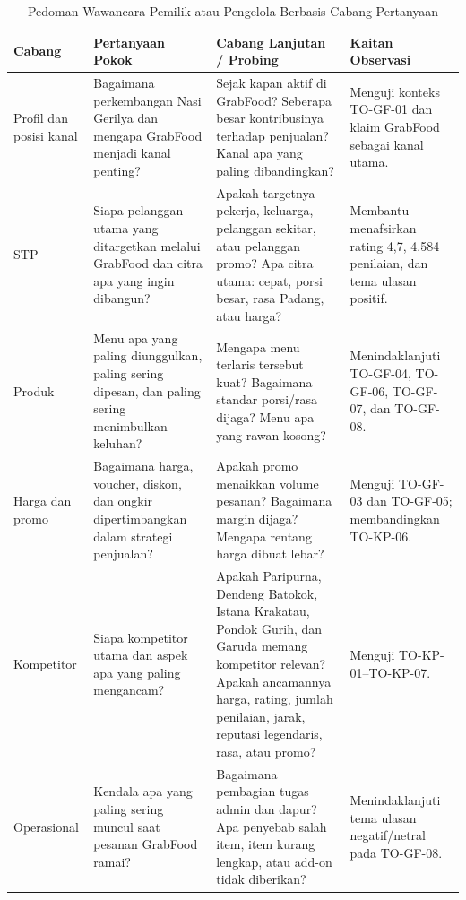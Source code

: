 \begin{table}[!htbp]
    \centering
    \caption{Pedoman Wawancara Pemilik atau Pengelola Berbasis Cabang Pertanyaan}
    \label{tab:pedoman-wawancara-pemilik-utama}
    \scriptsize
    \setlength{\tabcolsep}{2pt}
    \renewcommand{\arraystretch}{0.86}
    \begin{tabularx}{\textwidth}{|Z{2.2cm}|Y|Y|Y|}
        \toprule
        \textbf{Cabang} & \textbf{Pertanyaan Pokok} & \textbf{Cabang Lanjutan / Probing} & \textbf{Kaitan Observasi} \\ \hline
        \midrule
        Profil dan posisi kanal & Bagaimana perkembangan Nasi Gerilya dan mengapa GrabFood menjadi kanal penting? & Sejak kapan aktif di GrabFood? Seberapa besar kontribusinya terhadap penjualan? Kanal apa yang paling dibandingkan? & Menguji konteks TO-GF-01 dan klaim GrabFood sebagai kanal utama. \\ \hline
        STP & Siapa pelanggan utama yang ditargetkan melalui GrabFood dan citra apa yang ingin dibangun? & Apakah targetnya pekerja, keluarga, pelanggan sekitar, atau pelanggan promo? Apa citra utama: cepat, porsi besar, rasa Padang, atau harga? & Membantu menafsirkan rating 4,7, 4.584 penilaian, dan tema ulasan positif. \\ \hline
        Produk & Menu apa yang paling diunggulkan, paling sering dipesan, dan paling sering menimbulkan keluhan? & Mengapa menu terlaris tersebut kuat? Bagaimana standar porsi/rasa dijaga? Menu apa yang rawan kosong? & Menindaklanjuti TO-GF-04, TO-GF-06, TO-GF-07, dan TO-GF-08. \\ \hline
        Harga dan promo & Bagaimana harga, voucher, diskon, dan ongkir dipertimbangkan dalam strategi penjualan? & Apakah promo menaikkan volume pesanan? Bagaimana margin dijaga? Mengapa rentang harga dibuat lebar? & Menguji TO-GF-03 dan TO-GF-05; membandingkan TO-KP-06. \\ \hline
        Kompetitor & Siapa kompetitor utama dan aspek apa yang paling mengancam? & Apakah Paripurna, Dendeng Batokok, Istana Krakatau, Pondok Gurih, dan Garuda memang kompetitor relevan? Apakah ancamannya harga, rating, jumlah penilaian, jarak, reputasi legendaris, rasa, atau promo? & Menguji TO-KP-01--TO-KP-07. \\ \hline
        Operasional & Kendala apa yang paling sering muncul saat pesanan GrabFood ramai? & Bagaimana pembagian tugas admin dan dapur? Apa penyebab salah item, item kurang lengkap, atau add-on tidak diberikan? & Menindaklanjuti tema ulasan negatif/netral pada TO-GF-08. \\ \hline

\end{tabularx}
\end{table}
